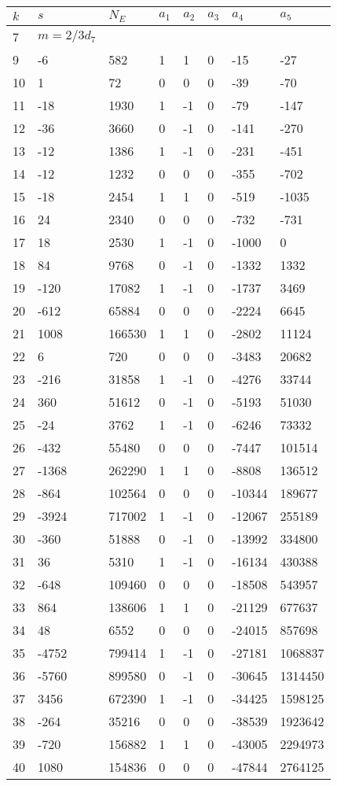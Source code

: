 \documentclass{amsart}
\begin{document}
\begin{longtable}{|l|l|l|lllll|}
\hline
$k$ & $s$ & $N_E$ & $a_1$ & $a_2$ & $a_3$ & $a_4$ & $a_5$\\
\hline
7&$m=2/3d_{7}$&&\multicolumn{5}{c|}{}\\
9&-6&582&1&1&0&-15&-27\\
10&1&72&0&0&0&-39&-70\\
11&-18&1930&1&-1&0&-79&-147\\
12&-36&3660&0&-1&0&-141&-270\\
13&-12&1386&1&-1&0&-231&-451\\
14&-12&1232&0&0&0&-355&-702\\
15&-18&2454&1&1&0&-519&-1035\\
16&24&2340&0&0&0&-732&-731\\
17&18&2530&1&-1&0&-1000&0\\
18&84&9768&0&-1&0&-1332&1332\\
19&-120&17082&1&-1&0&-1737&3469\\
20&-612&65884&0&0&0&-2224&6645\\
21&1008&166530&1&1&0&-2802&11124\\
22&6&720&0&0&0&-3483&20682\\
23&-216&31858&1&-1&0&-4276&33744\\
24&360&51612&0&-1&0&-5193&51030\\
25&-24&3762&1&-1&0&-6246&73332\\
26&-432&55480&0&0&0&-7447&101514\\
27&-1368&262290&1&1&0&-8808&136512\\
28&-864&102564&0&0&0&-10344&189677\\
29&-3924&717002&1&-1&0&-12067&255189\\
30&-360&51888&0&-1&0&-13992&334800\\
31&36&5310&1&-1&0&-16134&430388\\
32&-648&109460&0&0&0&-18508&543957\\
33&864&138606&1&1&0&-21129&677637\\
34&48&6552&0&0&0&-24015&857698\\
35&-4752&799414&1&-1&0&-27181&1068837\\
36&-5760&899580&0&-1&0&-30645&1314450\\
37&3456&672390&1&-1&0&-34425&1598125\\
38&-264&35216&0&0&0&-38539&1923642\\
39&-720&156882&1&1&0&-43005&2294973\\
40&1080&154836&0&0&0&-47844&2764125\\

\end{longtable}
\end{document}
